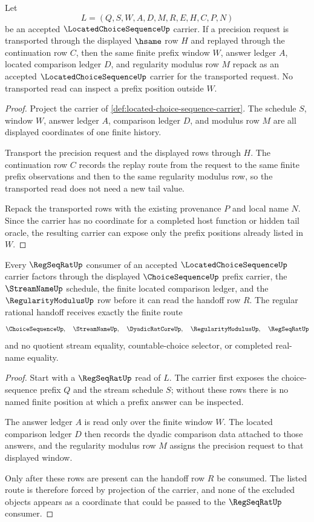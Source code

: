 \begin{theorem}
\label{thm:located-choice-sequence-modulus-stability}
Let
$$
L=(Q,S,W,A,D,M,R,E,H,C,P,N)
$$
be an accepted $\LocatedChoiceSequenceUp$ carrier. If a precision request is transported through the displayed $\hsame$ row $H$ and replayed through the continuation row $C$, then the same finite prefix window $W$, answer ledger $A$, located comparison ledger $D$, and regularity modulus row $M$ repack as an accepted $\LocatedChoiceSequenceUp$ carrier for the transported request. No transported read can inspect a prefix position outside $W$.
\end{theorem}
\begin{proof}
Project the carrier of \autoref{def:located-choice-sequence-carrier}. The schedule $S$, window $W$, answer ledger $A$, comparison ledger $D$, and modulus row $M$ are all displayed coordinates of one finite history.

Transport the precision request and the displayed rows through $H$. The continuation row $C$ records the replay route from the request to the same finite prefix observations and then to the same regularity modulus row, so the transported read does not need a new tail value.

Repack the transported rows with the existing provenance $P$ and local name $N$. Since the carrier has no coordinate for a completed host function or hidden tail oracle, the resulting carrier can expose only the prefix positions already listed in $W$.
\end{proof}

\begin{theorem}
\label{thm:located-choice-sequence-regseqrat-handoff}
Every $\RegSeqRatUp$ consumer of an accepted $\LocatedChoiceSequenceUp$ carrier factors through the displayed $\ChoiceSequenceUp$ prefix carrier, the $\StreamNameUp$ schedule, the finite located comparison ledger, and the $\RegularityModulusUp$ row before it can read the handoff row $R$. The regular rational handoff receives exactly the finite route
$$
\ChoiceSequenceUp,\quad \StreamNameUp,\quad \DyadicRatCoreUp,\quad \RegularityModulusUp,\quad \RegSeqRatUp
$$
and no quotient stream equality, countable-choice selector, or completed real-name equality.
\end{theorem}
\begin{proof}
Start with a $\RegSeqRatUp$ read of $L$. The carrier first exposes the choice-sequence prefix $Q$ and the stream schedule $S$; without these rows there is no named finite position at which a prefix answer can be inspected.

The answer ledger $A$ is read only over the finite window $W$. The located comparison ledger $D$ then records the dyadic comparison data attached to those answers, and the regularity modulus row $M$ assigns the precision request to that displayed window.

Only after these rows are present can the handoff row $R$ be consumed. The listed route is therefore forced by projection of the carrier, and none of the excluded objects appears as a coordinate that could be passed to the $\RegSeqRatUp$ consumer.
\end{proof}

